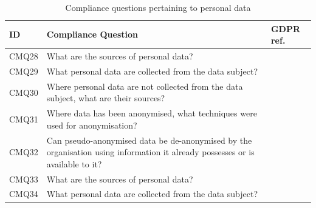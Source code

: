 \begin{table}
\small
\centering
\caption{Compliance questions pertaining to personal data}\label{table:info:compliance-personal-data}
\begin{tabularx}{\textwidth}{|l|X|l|}
\hline
\textbf{ID} & \textbf{Compliance Question} & \textbf{GDPR ref.} \\ \hline
CMQ28 & What are the sources of personal data? \\ \hline
CMQ29 & What personal data are collected from the data subject? \\ \hline
CMQ30 & Where personal data are not collected from the data subject, what are their sources? \\ \hline
CMQ31 & Where data has been anonymised, what techniques were used for anonymisation? \\ \hline
CMQ32 & Can pseudo-anonymised data be de-anonymised by the organisation using information it already possesses or is available to it? \\ \hline
CMQ33 & What are the sources of personal data? \\ \hline
CMQ34 & What personal data are collected from the data subject? \\ \hline
\end{tabularx}
\end{table}
